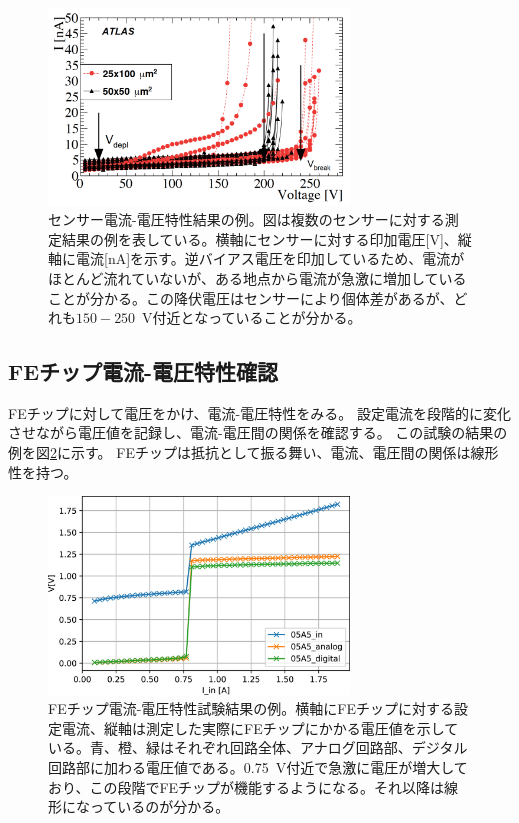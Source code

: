 \begin{figure}[bpt]\centering
\includegraphics[width=8cm]{./sensor_IV_result.png}
\caption[センサー電流-電圧特性結果の例]{センサー電流-電圧特性結果の例\cite{1-1}。図は複数のセンサーに対する測定結果の例を表している。横軸にセンサーに対する印加電圧[V]、縦軸に電流[nA]を示す。逆バイアス電圧を印加しているため、電流がほとんど流れていないが、ある地点から電流が急激に増加していることが分かる。この降伏電圧はセンサーにより個体差があるが、どれも$150-250$~V付近となっていることが分かる。}
\label{sensor_IV_result}
\end{figure}

\subsection{FEチップ電流-電圧特性確認}
FEチップに対して電圧をかけ、電流-電圧特性をみる。
設定電流を段階的に変化させながら電圧値を記録し、電流-電圧間の関係を確認する。
この試験の結果の例を図\ref{SLDO_VI_result}に示す。
FEチップは抵抗として振る舞い、電流、電圧間の関係は線形性を持つ。

\begin{figure}[bpt]\centering
\includegraphics[width=8cm]{./SLDO_VI_result.jpg}
\caption[FEチップ電流-電圧特性試験結果の例。]{FEチップ電流-電圧特性試験結果の例\cite{3-7}。横軸にFEチップに対する設定電流、縦軸は測定した実際にFEチップにかかる電圧値を示している。青、橙、緑はそれぞれ回路全体、アナログ回路部、デジタル回路部に加わる電圧値である。0.75~V付近で急激に電圧が増大しており、この段階でFEチップが機能するようになる。それ以降は線形になっているのが分かる。}
\label{SLDO_VI_result}
\end{figure}

